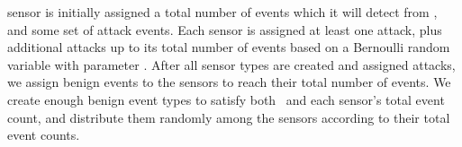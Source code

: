 sensor is initially assigned a total number of events which it will
detect from \numEventProtosDetected, and some set of attack
events. Each sensor is assigned at least one attack, plus
additional attacks up to its total number of events based on a 
Bernoulli random variable with parameter
\sensorOverlap.  After all sensor types are
created and assigned attacks, we assign benign events to the sensors
to reach their total number of events.
We create enough benign event types to satisfy
both \sensorToBenignRatio\ and each sensor's total event count, and
distribute them randomly among the sensors according to their total
event counts. 


